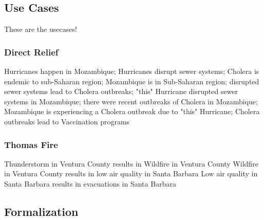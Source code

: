 \subsection{Use Cases}
\label{ssec:use-cases}
These are the usecases!

\subsubsection{Direct Relief}
Hurricanes happen in Mozambique; Hurricanes disrupt sewer systems; Cholera is endemic to sub-Saharan region; Mozambique is in Sub-Saharan region; disrupted sewer systems lead to Cholera outbreaks; "this" Hurricane disrupted sewer systems in Mozambique; there were recent outbreaks of Cholera in Mozambique; Mozambique is experiencing a Cholera outbreak due to "this" Hurricane; Cholera outbreaks lead to Vaccination programs

\subsubsection{Thomas Fire}
Thunderstorm in Ventura County results in Wildfire in Ventura County
Wildfire in Ventura County results in low air quality in Santa Barbara
Low air quality in Santa Barbara results in evacuations in Santa Barbara

\subsection{Formalization}
\label{ssec:formalization}
